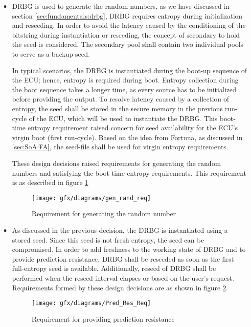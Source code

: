 \begin{itemize}
	\item DRBG is used to generate the random numbers, as we have discussed in section \ref{sec:fundamentals:drbg}, DRBG requires entropy during initialization and reseeding. In order to avoid the latency caused by the conditioning of the bitstring during instantiation or reseeding, the concept of secondary to hold the seed is considered. The secondary pool shall contain two individual pools to serve as a backup seed. 
	
	In typical scenarios, the DRBG is instantiated during the boot-up sequence of the ECU; hence, entropy is required during boot. Entropy collection during the boot sequence takes a longer time, as every source has to be initialized before providing the output. To resolve latency caused by a collection of entropy, the seed shall be stored in the secure memory in the previous run-cycle of the ECU, which will be used to instantiate the DRBG. This boot-time entropy requirement raised concern for seed availability for the ECU's virgin boot (first run-cycle). Based on the idea from Fortuna, as discussed in \ref{sec:SoA:FA}, the seed-file shall be used for virgin entropy requirements.
	
	These design decisions raised requirements for generating the random numbers and satisfying the boot-time entropy requirements. This requirement is as described in figure \ref{fig:4:8}
	
	\begin{figure}[!h]
		\centering
		\texttt{[image: gfx/diagrams/gen\_rand\_req]}
		\caption{Requirement for generating the random number}
		\label{fig:4:8}
	\end{figure}

	\item As discussed in the previous decision, the DRBG is instantiated using a stored seed. Since this seed is not fresh entropy, the seed can be compromised. In order to add freshness to the working state of DRBG and to provide prediction resistance, DRBG shall be reseeded as soon as the first full-entropy seed is available. Additionally, reseed of DRBG shall be performed when the reseed interval elapses or based on the user's request. Requirements formed by these design decisions are as shown in figure \ref{fig:4:9}.
	
	\begin{figure}[!h]
		\centering
		\texttt{[image: gfx/diagrams/Pred\_Res\_Req]}
		\caption{Requirement for providing prediction resistance}
		\label{fig:4:9}
	\end{figure}


\end{itemize}
